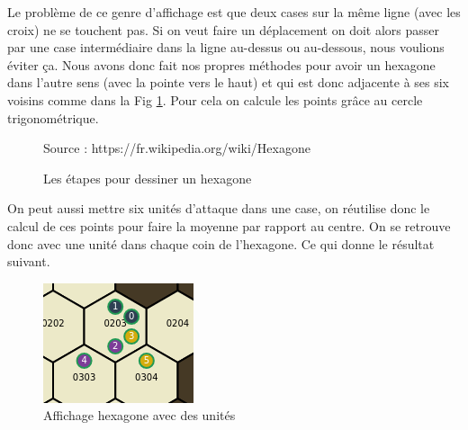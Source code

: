 Le problème de ce genre d'affichage est que deux cases sur la même ligne (avec les croix) ne se touchent pas. Si on veut faire un déplacement on doit alors passer par une case intermédiaire dans la ligne au-dessus ou au-dessous, nous voulions éviter ça. Nous avons donc fait nos propres méthodes pour avoir un hexagone dans l'autre sens (avec la pointe vers le haut) et qui est donc adjacente à ses six voisins comme dans la Fig \ref{fig:hexagon}. Pour cela on calcule les points grâce au cercle trigonométrique.



\begin{figure}[H]
    \centering
    \def\stackalignment{r}
    {\scriptsize%
        Source : https://fr.wikipedia.org/wiki/Hexagone}
    \caption{Les étapes pour dessiner un hexagone}
    \label{fig:hexagon}
\end{figure}

On peut aussi mettre six unités d'attaque dans une case, on réutilise donc le calcul de ces points pour faire la moyenne par rapport au centre. On se retrouve donc avec une unité dans chaque coin de l'hexagone. Ce qui donne le résultat suivant.

\begin{figure}[H]
    \centering
    \includegraphics[scale=.7]{data/hexagon_with_units.png}
    \caption{Affichage hexagone avec des unités}
    \label{fig:hexagon_with_units}
\end{figure}